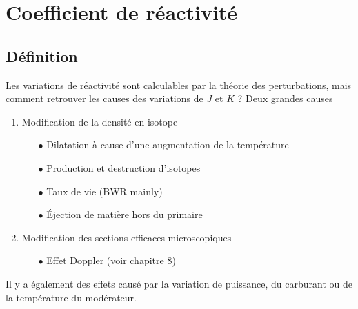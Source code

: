 	
\section{Coefficient de réactivité}
	\subsection{Définition}
	Les variations de réactivité sont calculables par la théorie des perturbations, mais comment 
	retrouver les causes des variations de $J$ et $K$ ? Deux grandes causes
	\begin{enumerate}
	\item Modification de la densité en isotope
		\begin{itemize}
		\item[$\bullet$] Dilatation à cause d'une augmentation de la température
		\item[$\bullet$] Production et destruction d'isotopes
		\item[$\bullet$] Taux de vie (BWR mainly)
		\item[$\bullet$] Éjection de matière hors du primaire
		\end{itemize}
	\item Modification des sections efficaces microscopiques
		\begin{itemize}
		\item[$\bullet$] Effet Doppler (voir chapitre 8)
		\end{itemize}		
	\end{enumerate}
	Il y a également des effets causé par la variation de puissance, du carburant ou de la température
	du modérateur.
	
